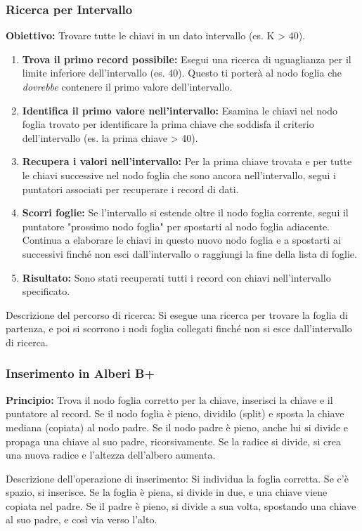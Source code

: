 \subsubsection{Ricerca per Intervallo}
\textbf{Obiettivo:} Trovare tutte le chiavi in un dato intervallo (es. K > 40).
\begin{enumerate}
    \item \textbf{Trova il primo record possibile:} Esegui una ricerca di uguaglianza per il limite inferiore dell'intervallo (es. 40). Questo ti porterà al nodo foglia che \textit{dovrebbe} contenere il primo valore dell'intervallo.
    \item \textbf{Identifica il primo valore nell'intervallo:} Esamina le chiavi nel nodo foglia trovato per identificare la prima chiave che soddisfa il criterio dell'intervallo (es. la prima chiave > 40).
    \item \textbf{Recupera i valori nell'intervallo:} Per la prima chiave trovata e per tutte le chiavi successive nel nodo foglia che sono ancora nell'intervallo, segui i puntatori associati per recuperare i record di dati.
    \item \textbf{Scorri foglie:} Se l'intervallo si estende oltre il nodo foglia corrente, segui il puntatore "prossimo nodo foglia" per spostarti al nodo foglia adiacente. Continua a elaborare le chiavi in questo nuovo nodo foglia e a spostarti ai successivi finché non esci dall'intervallo o raggiungi la fine della lista di foglie.
    \item \textbf{Risultato:} Sono stati recuperati tutti i record con chiavi nell'intervallo specificato.
\end{enumerate}
Descrizione del percorso di ricerca: Si esegue una ricerca per trovare la foglia di partenza, e poi si scorrono i nodi foglia collegati finché non si esce dall'intervallo di ricerca.

\subsubsection{Inserimento in Alberi B+}
\textbf{Principio:} Trova il nodo foglia corretto per la chiave, inserisci la chiave e il puntatore al record. Se il nodo foglia è pieno, dividilo (split) e sposta la chiave mediana (copiata) al nodo padre. Se il nodo padre è pieno, anche lui si divide e propaga una chiave al suo padre, ricorsivamente. Se la radice si divide, si crea una nuova radice e l'altezza dell'albero aumenta.

Descrizione dell'operazione di inserimento: Si individua la foglia corretta. Se c'è spazio, si inserisce. Se la foglia è piena, si divide in due, e una chiave viene copiata nel padre. Se il padre è pieno, si divide a sua volta, spostando una chiave al suo padre, e così via verso l'alto.

